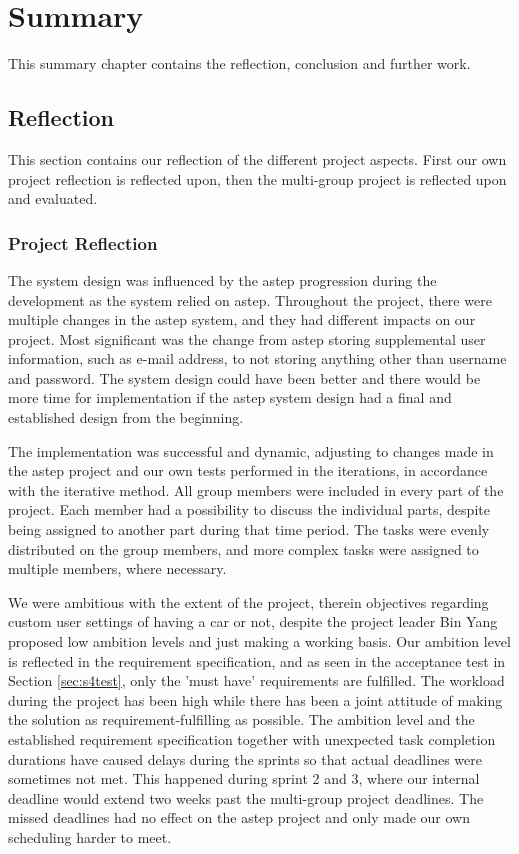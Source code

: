 \chapter{Summary}
This summary chapter contains the reflection, conclusion and further work.

\section{Reflection}
This section contains our reflection of the different project aspects.
First our own project reflection is reflected upon, then the multi-group project is reflected upon and evaluated.

\subsection{Project Reflection}
The system design was influenced by the \gls{astep} progression during the development as the system relied on \gls{astep}.
Throughout the project, there were multiple changes in the \gls{astep} system, and they had different impacts on our project.
Most significant was the change from \gls{astep} storing supplemental user information, such as e-mail address, to not storing anything other than username and password.
The system design could have been better and there would be more time for implementation if the \gls{astep} system design had a final and established design from the beginning.

The implementation was successful and dynamic, adjusting to changes made in the \gls{astep} project and our own tests performed in the iterations, in accordance with the iterative method.
All group members were included in every part of the project.
Each member had a possibility to discuss the individual parts, despite being assigned to another part during that time period.
The tasks were evenly distributed on the group members, and more complex tasks were assigned to multiple members, where necessary.

We were ambitious with the extent of the project, therein objectives regarding custom user settings of having a car or not, despite the project leader Bin Yang proposed low ambition levels and just making a working basis.
Our ambition level is reflected in the requirement specification, and as seen in the acceptance test in Section \ref{sec:s4test}, only the 'must have' requirements are fulfilled.
The workload during the project has been high while there has been a joint attitude of making the solution as requirement-fulfilling as possible.
The ambition level and the established requirement specification together with unexpected task completion durations have caused delays during the sprints so that actual deadlines were sometimes not met.
This happened during sprint 2 and 3, where our internal deadline would extend two weeks past the multi-group project deadlines.
The missed deadlines had no effect on the \gls{astep} project and only made our own scheduling harder to meet.

